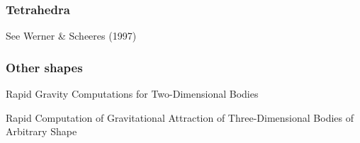 \subsubsection{Tetrahedra}

See Werner \& Scheeres (1997) \cite{wesc97}



\subsubsection{Other shapes}

\Literature

Rapid Gravity Computations for Two-Dimensional Bodies \cite{tawl59}

Rapid Computation of Gravitational Attraction of Three-Dimensional Bodies of Arbitrary Shape
\cite{taew60}




